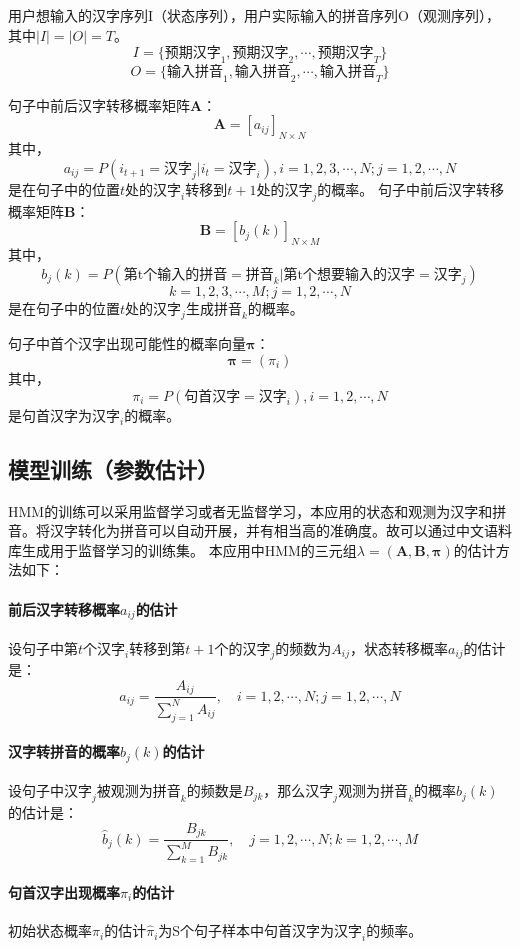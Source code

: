 \documentclass[12pt,a4paper,draft]{ctexart}
\begin{document}
用户想输入的汉字序列I（状态序列），用户实际输入的拼音序列O（观测序列），其中$ |I|=|O|=T $。
\[ I=\{ \mbox{预期汉字}_1,\mbox{预期汉字}_2,\cdots,\mbox{预期汉字}_T \}	\]
\[O=\{ \mbox{输入拼音}_1,\mbox{输入拼音}_2,\cdots,\mbox{输入拼音}_T \}  \]

句子中前后汉字转移概率矩阵$\bm{A}$：
\[ \bm{A}=[a_{ij}]_{N\times N} \]
其中，
\[ a_{ij}=P(i_{t+1}=\mbox{汉字}_j|i_t=\mbox{汉字}_i),  i=1,2,3,\cdots,N; j=1,2,\cdots,N\]
是在句子中的位置$ t $处的$ \mbox{汉字}_i $转移到$ t+1 $处的$ \mbox{汉字}_j $的概率。
句子中前后汉字转移概率矩阵$\bm{B}$：
\[ \bm{B}=[b_j(k)]_{N\times M} \]
其中，
\[ b_j(k)=P(\mbox{第t个输入的拼音}=\mbox{拼音}_k|\mbox{第t个想要输入的汉字}=\mbox{汉字}_j) \]
\[ k=1,2,3,\cdots,M; j=1,2,\cdots,N\]
是在句子中的位置$ t $处的$ \mbox{汉字}_j $生成$ \mbox{拼音}_k $的概率。

句子中首个汉字出现可能性的概率向量$\bm{\pi}$：
\[ \bm{\pi}=(\pi_i) \]
其中，
\[ \pi_i=P(\mbox{句首汉字}=\mbox{汉字}_i), i=1,2,\cdots,N \]
是句首汉字为$\mbox{汉字}_i$的概率。
\subsection{模型训练（参数估计）}
HMM的训练可以采用监督学习或者无监督学习\cite{李航统计学习}，本应用的状态和观测为汉字和拼音。将汉字转化为拼音可以自动开展\cite{python-pinyin}，并有相当高的准确度\cite{accuracy-of-auto-pinyin}。故可以通过中文语料库生成用于监督学习的训练集。
本应用中HMM的三元组$ \lambda=(\bm{A},\bm{B},\bm{\pi}) $的估计方法如下：
\paragraph{前后汉字转移概率$a_{ij}$的估计}
设句子中第$ t $个$\mbox{汉字}_i$转移到第$ t+1 $个的$\mbox{汉字}_j$的频数为$A_{ij}$，状态转移概率$a_{ij}$的估计是：
\[ \hat{a}_{i j}=\frac{A_{ij}}{\sum_{j=1}^{N} A_{i j}}, \quad i=1,2, \cdots, N ; j=1,2, \cdots, N \]
\paragraph{汉字转拼音的概率$b_j(k)$的估计}
设句子中$\mbox{汉字}_j$被观测为$\mbox{拼音}_k$的频数是$B_{j k}$，那么$\mbox{汉字}_j$观测为$\mbox{拼音}_k$的概率$b_{j}(k)$的估计是：
\[ \hat{b}_{j}(k)=\frac{B_{j k}}{\sum_{k=1}^{M} B_{j k}}, \quad j=1,2, \cdots, N ; k=1,2, \cdots, M \]
\paragraph{句首汉字出现概率$\pi_i$的估计}
初始状态概率$\pi_i$的估计$\hat{\pi}_i$为S个句子样本中句首汉字为$\mbox{汉字}_i$的频率。
\end{document}
